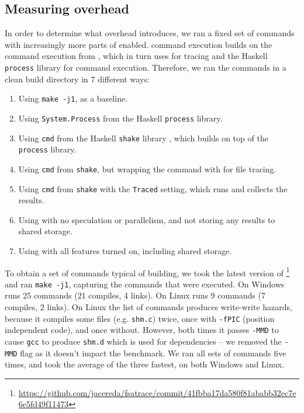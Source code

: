\subsection{Measuring overhead}
\label{sec:eval:overhead}

In order to determine what overhead \Rattle introduces, we ran a fixed set of commands with increasingly more parts of \Rattle enabled. \Rattle command execution builds on the command execution from \Shake \cite{shake}, which in turn uses \Fsatrace for tracing and the Haskell \texttt{process} library for command execution. Therefore, we ran the commands in a clean build directory in 7 different ways:

\begin{enumerate}
\item Using \texttt{make -j1}, as a baseline.
\item Using \texttt{System.Process} from the Haskell \texttt{process} library.
\item Using \texttt{cmd} from the Haskell \texttt{shake} library \cite{shake}, which builds on top of the \texttt{process} library.
\item Using \texttt{cmd} from \texttt{shake}, but wrapping the command with \Fsatrace for file tracing.
\item Using \texttt{cmd} from \texttt{shake} with the \texttt{Traced} setting, which runs \Fsatrace and collects the results.
\item Using \Rattle with no speculation or parallelism, and not storing any results to shared storage.
\item Using \Rattle with all features turned on, including shared storage.
\end{enumerate}

To obtain a set of commands typical of building, we took the latest version of \Fsatrace\footnote{\url{https://github.com/jacereda/fsatrace/commit/41fbba17da580f81ababb32ec7e6e5fd49f11473}} and ran \texttt{make -j1}, capturing the commands that were executed. On Windows \Fsatrace runs 25 commands (21 compiles, 4 links). On Linux \Fsatrace runs 9 commands (7 compiles, 2 links). On Linux the list of commands produces write-write hazards, because it compiles some files (e.g. \texttt{shm.c}) twice, once with \texttt{-fPIC} (position independent code), and once without. However, both times it passes \texttt{-MMD} to cause \texttt{gcc} to produce \texttt{shm.d} which is used for dependencies -- we removed the \texttt{-MMD} flag as it doesn't impact the benchmark. We ran all sets of commands five times, and took the average of the three fastest, on both Windows and Linux.

